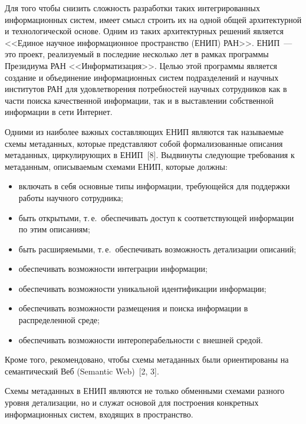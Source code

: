 \begin{multicols}{2}
  Для того чтобы снизить сложность разработки таких интегрированных информационных 
систем, имеет смысл строить их на одной общей архитектурной и технологической основе. 
Одним из таких архитектурных решений является <<Единое научное информационное 
пространство (ЕНИП) РАН>>. ЕНИП~--- это проект, реализуемый в последние несколько лет 
в рамках программы Президиума РАН <<Информатизация>>. Целью этой программы 
является создание и объединение информационных сис\-тем подразделений и научных 
институтов РАН для удовлетворения потребностей научных сотрудников как в части поиска 
качественной информации, так и в выставлении собственной информации в сети Интернет.
  
  Одними из наиболее важных составляющих ЕНИП являются так называемые схемы 
метаданных, которые представляют собой формализованные описания метаданных, 
циркулирующих в ЕНИП~[8]. Выдвинуты следующие требования к метаданным, 
описываемым схемами ЕНИП, которые должны:
  \begin{itemize}
\item  включать в себя основные типы информации, требующейся для 
поддержки работы научного сотрудника;\\[-14pt]
\item быть открытыми, т.\,е.\ обеспечивать доступ к соответствующей 
информации по этим описаниям;\\[-14pt]
\item быть расширяемыми, т.\,е.\ обеспечивать возможность детализации 
описаний;\\[-14pt]
\item обеспечивать возможности интеграции информации;\\[-14pt]
\item обеспечивать возможности уникальной идентификации информации;\\[-14pt]
\item обеспечивать возможности размещения и поиска информации в 
распределенной среде;\\[-14pt]
\item обеспечивать возможности интеропера\-бель\-ности с внешней средой.
\end{itemize}

  Кроме того, рекомендовано, чтобы схемы метаданных были ориентированы на 
семантический Веб (Semantic Web)~[2, 3].
  
  Схемы метаданных в ЕНИП являются не только обменными схемами разного уровня 
детализации, но и служат основой для построения конкретных информационных систем, 
входящих в пространство.


\end{multicols}
